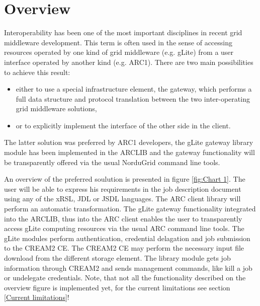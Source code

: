\documentclass{article}
\begin{document}
\section{Overview}
\label{Overview}
Interoperability has been one of the most important disciplines in recent grid middleware development. This term is often used in the sense of accessing resources operated by one kind of grid middleware (e.g. gLite) from a user interface operated by another kind (e.g. ARC1). There are two main possibilities to achieve this result:
\begin{itemize}
\item either to use a special infrastructure element, the gateway, which performs a full data structure and protocol translation between the two inter-operating grid middleware solutions,
\item or to explicitly implement the interface of the other side in the client.
\end{itemize}
The latter solution was preferred by ARC1 developers, the gLite gateway library module has been implemented in the ARCLIB and the gateway functionality will be transparently offered via the usual NorduGrid command line tools.\par
An overview of the preferred soulution is presented in figure \ref{fig:Chart 1}. The user will be able to express his requirements in the job description document using any of the xRSL\cite{xrsl}, JDL or JSDL\cite{jsdl} languages. The ARC client library will perform an automatic transformation. The gLite gateway functionality integrated into the ARCLIB, thus into the ARC client enables the user to transparently access gLite computing resources via the usual ARC command line tools. The gLite modules perform authentication, credential delagation and job submission to the CREAM2 CE. The CREAM2 CE may perform the necessary input file download from the different storage element. The library module gets job information through CREAM2 and sends management commands, like kill a job or undelegate credentials. Note, that not all the functionality described on the overview figure is implemented yet, for the current limitations see section \ref{Current limitations}!\par
\begin{figure}[ht]
\end{figure}
\end{document}

